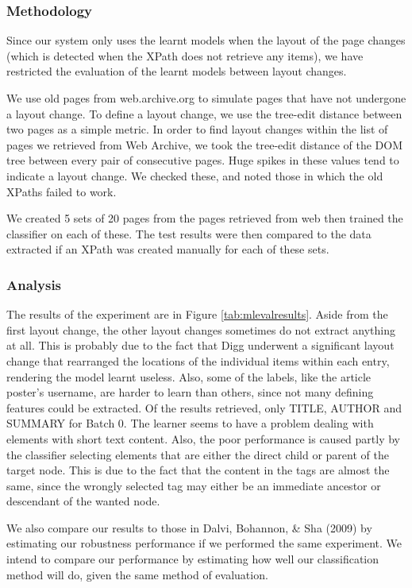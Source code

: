 \documentclass[a4paper,12pt]{nurop}
\begin{document}
\subsubsection{Methodology}
	Since our system only uses the learnt models when the layout of the page changes (which is 
detected when the XPath does not retrieve any items), we have restricted the evaluation of 
the learnt models between layout changes.

	We use old pages from web.archive.org to simulate pages that have not
undergone a layout change. To define a layout change, we use the tree-edit distance \cite{Zhang1989} between two pages as
a simple metric. In order to find layout changes within the list of pages we retrieved from Web
Archive, we took the tree-edit distance of the DOM tree between every pair of consecutive pages.
Huge spikes in these values tend to indicate a layout change. We checked these, and noted those
in which the old XPaths failed to work.

 We created 5 sets of 20 pages from the pages retrieved from web
then trained the classifier on each of these. The test results were then compared to the data
extracted if an XPath was created manually for each of these sets.

\subsubsection{Analysis}

The results of the experiment are in Figure \ref{tab:mlevalresults}. 
Aside from the first layout change, the other layout changes sometimes do not extract anything
at all. This is probably due to the fact that Digg underwent a significant layout change that
rearranged the locations of the individual items within each entry, rendering the model learnt
useless. Also, some of the labels, like the article poster's username, are harder to learn
than others, since not many defining features could be extracted. Of the results retrieved,
only TITLE, AUTHOR and SUMMARY for Batch 0. The learner seems to have a problem dealing with
elements with short text content. Also, the poor performance is caused partly by 
the classifier selecting elements that are either the direct child or parent of the target node.
This is due to the fact that the content in the tags are almost the same, since the wrongly
selected tag may either be an immediate ancestor or descendant of the wanted node.


We also compare our results to those in Dalvi, Bohannon, \& Sha (2009) by estimating our
robustness performance if we performed the same experiment. We intend to compare our performance
by estimating how well our classification method will do, given the same
method of evaluation.
\end{document}
